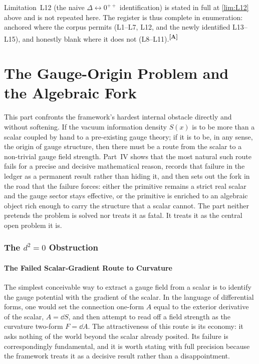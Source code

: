 \documentclass[12pt,a4paper,twoside]{article}
\theoremstyle{plain}
\theoremstyle{definition}
\theoremstyle{remark}
\newcommand{\catmark}[1]{\textsuperscript{\textsf{\textbf{[#1]}}}}
\begin{document}
\noindent Limitation~L12 (the naive $\Delta\!\leftrightarrow\!0^{++}$ identification) is stated in full at \cref{lim:L12} above and is not repeated here. The register is thus complete in enumeration: anchored where the corpus permits (L1--L7, L12, and the newly identified L13--L15), and honestly blank where it does not (L8--L11).\catmark{A}


\part{The Gauge-Origin Problem and the Algebraic Fork}
\label{part:gauge-origin}

\noindent This part confronts the framework's hardest internal obstacle directly and without softening. If the vacuum information density $S(x)$ is to be more than a scalar coupled by hand to a pre-existing gauge theory; if it is to be, in any sense, the origin of gauge structure, then there must be a route from the scalar to a non-trivial gauge field strength. Part~IV shows that the most natural such route fails for a precise and decisive mathematical reason, records that failure in the ledger as a permanent result rather than hiding it, and then sets out the fork in the road that the failure forces: either the primitive remains a strict real scalar and the gauge sector stays effective, or the primitive is enriched to an algebraic object rich enough to carry the structure that a scalar cannot. The part neither pretends the problem is solved nor treats it as fatal. It treats it as the central open problem it is.

\section{The \texorpdfstring{$d^2 = 0$}{d2=0} Obstruction}
\label{sec:d2-obstruction}

\subsection{The Failed Scalar-Gradient Route to Curvature}
\label{subsec:failed-scalar-gradient}

The simplest conceivable way to extract a gauge field from a scalar is to identify the gauge potential with the gradient of the scalar. In the language of differential forms, one would set the connection one-form $A$ equal to the exterior derivative of the scalar, $A = \dd S$, and then attempt to read off a field strength as the curvature two-form $F = \dd A$. The attractiveness of this route is its economy: it asks nothing of the world beyond the scalar already posited. Its failure is correspondingly fundamental, and it is worth stating with full precision because the framework treats it as a decisive result rather than a disappointment.
\end{document}

